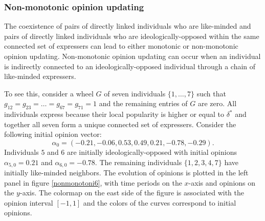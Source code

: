 \documentclass{article}
\begin{document}
\subsubsection{Non-monotonic opinion updating}

The coexistence of pairs of directly linked individuals who are like-minded and pairs of directly linked individuals who are ideologically-opposed within the same connected set of expressers can lead to either monotonic or non-monotonic opinion updating. Non-monotonic opinion updating can occur when an individual is indirectly connected to an ideologically-opposed individual through a chain of like-minded expressers.  

  
To see this, consider a wheel $G$ of seven individuals $\{ 1, \ldots , 7 \}$ such that $g_{12}=g_{23}= \ldots =g_{67}= g_{71}=1$ and the remaining entries of $G$ are zero. All individuals express because their local popularity is higher or equal to $\delta^{*}$ and together all seven form a unique connected set of expressers. Consider the following initial opinion vector: $$\alpha_0=(-0.21, -0.06, 0.53, 0.49, 0.21, -0.78, -0.29 ).$$ Individuals $5$ and $6$ are initially ideologically-opposed with initial opinions  $\alpha_{5,0}=0.21$ and $\alpha_{6,0}=-0.78$. The remaining individuals $\{ 1,2,3,4,7\}$ have initially like-minded neighbors. The evolution of opinions is plotted in the left panel in figure \ref{nonmonotoni6}, with time periods on the $x$-axis and opinions on the $y$-axis. The colormap on the east side of the figure is associated with the opinion interval $[-1,1]$ and the colors of the curves correspond to initial opinions. 
\end{document}
